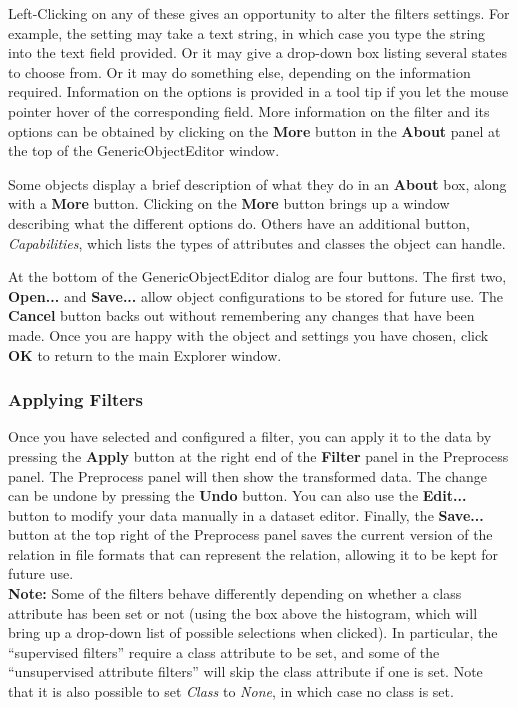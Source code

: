 \documentclass[a4paper]{article}
\begin{document}
Left-Clicking on any of these gives an
opportunity to alter the filters settings. For example, the setting
may take a text string, in which case you type the string into the
text field provided.  Or it may give a drop-down box listing several
states to choose from. Or it may do something else, depending on the
information required. Information on the options is provided in a tool
tip if you let the mouse pointer hover of the corresponding
field. More information on the filter and its options can be obtained
by clicking on the \textbf{More} button in the \textbf{About} panel at
the top of the GenericObjectEditor window.

Some objects display a brief description of what they do in an \textbf{About}
box, along with a \textbf{More} button. Clicking on the \textbf{More} button
brings up a window describing what the different options do. Others have an 
additional button, \textit{Capabilities}, which lists the types of
attributes and classes the object can handle. 

At the bottom of the GenericObjectEditor dialog are four buttons. The first
two, \textbf{Open...} and \textbf{Save...} allow object configurations to be
stored for future use. The \textbf{Cancel} button backs out without remembering
any changes that have been made.  Once you are happy with the object and
settings you have chosen, click \textbf{OK} to return to the main Explorer
window.

\subsubsection*{Applying Filters}

Once you have selected and configured a filter, you can apply it to
the data by pressing the \textbf{Apply} button at the right end of the
\textbf{Filter} panel in the Preprocess panel. The Preprocess panel
will then show the transformed data. The change can be undone by
pressing the \textbf{Undo} button. You can also use the
\textbf{Edit...} button to modify your data manually in a dataset
editor.  Finally, the \textbf{Save...}  button at the top right of the
Preprocess panel saves the current version of the relation in file
formats that can represent the relation, allowing it to be kept for future
use.  \\

\noindent \textbf{Note:} Some of the filters behave differently
depending on whether a class attribute has been set or not (using the
box above the histogram, which will bring up a drop-down list of
possible selections when clicked). In particular, the ``supervised
filters'' require a class attribute to be set, and some of the
``unsupervised attribute filters'' will skip the class attribute if
one is set. Note that it is also possible to set {\em Class} to {\em
None}, in which case no class is set.
\end{document}
